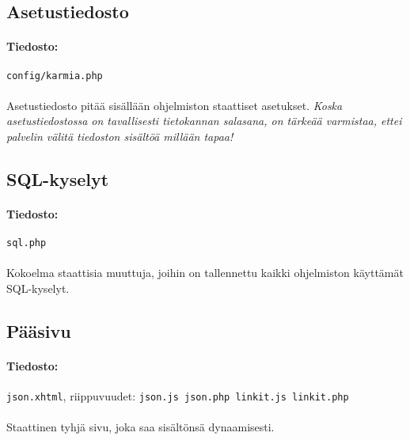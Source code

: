 \documentclass[11pt]{article}
\begin{document}

\subsection{Asetustiedosto}

\paragraph{Tiedosto:} \large{\texttt{config/karmia.php}}

\paragraph{} Asetustiedosto pitää sisällään ohjelmiston staattiset asetukset. \emph{Koska asetustiedostossa on tavallisesti tietokannan salasana, on tärkeää varmistaa, ettei palvelin välitä tiedoston sisältöä millään tapaa!}


\subsection{SQL-kyselyt}

\paragraph{Tiedosto:} \large{\texttt{sql.php}}

\paragraph{} Kokoelma staattisia muuttuja, joihin on tallennettu kaikki ohjelmiston käyttämät SQL-kyselyt.


\subsection{Pääsivu}

\paragraph{Tiedosto:} \large{\texttt{json.xhtml}}, riippuvuudet: \texttt{json.js json.php linkit.js linkit.php}

\paragraph{} Staattinen tyhjä sivu, joka saa sisältönsä dynaamisesti.
\end{document}
